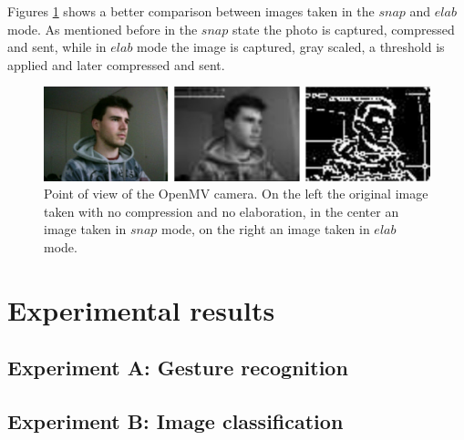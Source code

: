 \documentclass[12pt]{report}
\begin{document}
Figures \ref{fig:openmv_pov} shows a better comparison between images taken in the $snap$ and $elab$ mode. As mentioned before in the $snap$ state the photo is captured, compressed and sent, while in $elab$ mode the image is captured, gray scaled, a threshold is applied and later compressed and sent.

\begin{figure}[h!]
    \centering
    \includegraphics[width=140mm]{Figures/Chapter4/openmv_pov.jpg} 
    \caption{Point of view of the OpenMV camera. On the left the original image taken with no compression and no elaboration, in the center an image taken in $snap$ mode, on the right an image taken in $elab$ mode.}
    \label{fig:openmv_pov}    
\end{figure}


\chapter{Experimental results} 

\section{Experiment A: Gesture recognition}

\section{Experiment B: Image classification}
\end{document}
